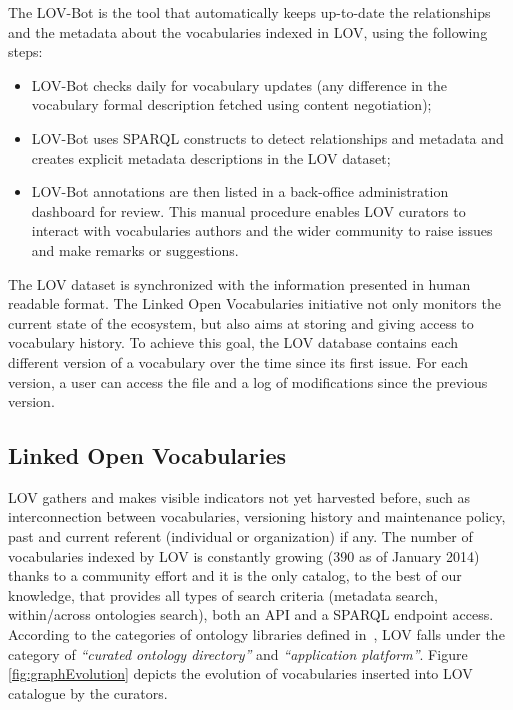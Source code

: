 The LOV-Bot is the tool that automatically keeps up-to-date the relationships and the metadata about the vocabularies indexed in LOV, using the following steps:
\begin{itemize}
  \item	LOV-Bot checks daily  for vocabulary updates (any difference in the vocabulary formal description fetched using content negotiation);
  \item	LOV-Bot uses SPARQL constructs to detect relationships and metadata and creates explicit metadata descriptions in the LOV dataset;
  \item	LOV-Bot annotations are then listed in a back-office administration dashboard for review. This manual procedure enables LOV curators to interact with vocabularies authors and the wider community to raise issues and make remarks or suggestions.
\end{itemize}
The LOV dataset is synchronized with the information presented in human readable format. The Linked Open Vocabularies initiative not only monitors the current state of the ecosystem, but also aims at storing and giving access to vocabulary history. To achieve this goal, the LOV database contains each different version of a vocabulary over the time since its first issue. For each version, a user can access the file and a log of modifications since the previous version.

\subsection{Linked Open Vocabularies}     \label{sec:lov}

LOV gathers and makes visible indicators not yet harvested before, such as interconnection between vocabularies, versioning history and maintenance policy, past and current referent (individual or organization) if any. The number of vocabularies indexed by LOV is constantly growing (390 as of January 2014) thanks to a community effort and it is the only catalog, to the best of our knowledge, that provides all types of search criteria (metadata search, within/across ontologies search), both an API and a SPARQL endpoint access. According to the categories of ontology libraries defined in~\cite{AquinJoWS12}, LOV falls under the category of \textit{``curated ontology directory''}  and \textit{``application platform''}. Figure \ref{fig:graphEvolution} depicts the evolution of vocabularies inserted into LOV catalogue by the curators.

